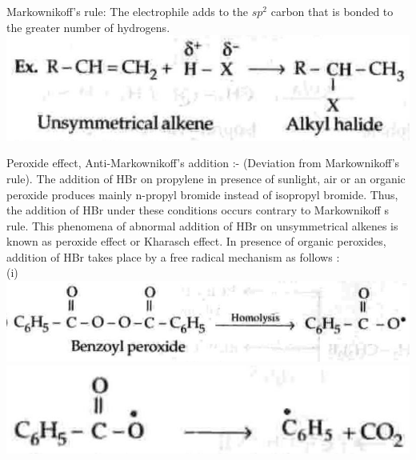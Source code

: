 \documentclass[10pt]{article}
\begin{document}
Markownikoff's rule: The electrophile adds to the $s p^{2}$ carbon that is bonded to the greater number of hydrogens.\\
\includegraphics[max width=\textwidth, center]{2025_01_28_8470952b98110cec3aabg-181}

Peroxide effect, Anti-Markownikoff's addition :- (Deviation from Markownikoff's rule). The addition of HBr on propylene in presence of sunlight, air or an organic peroxide produces mainly n-propyl bromide instead of isopropyl bromide. Thus, the addition of HBr under these conditions occurs contrary to Markownikoff s rule. This phenomena of abnormal addition of HBr on unsymmetrical alkenes is known as peroxide effect or Kharasch effect. In presence of organic peroxides, addition of HBr takes place by a free radical mechanism as follows :\\
(i)\\
\includegraphics[max width=\textwidth, center]{2025_01_28_8470952b98110cec3aabg-181(2)}\\
\includegraphics[max width=\textwidth, center]{2025_01_28_8470952b98110cec3aabg-181(3)}
\end{document}
